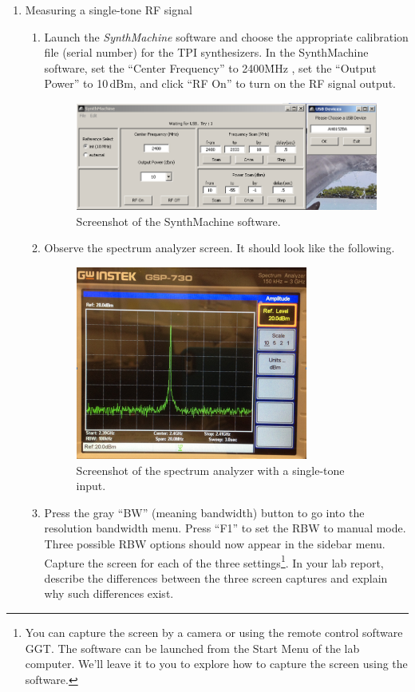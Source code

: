 \documentclass[letterpaper, 11pt]{article}
\begin{document}
\begin{enumerate}
	\item Measuring a single-tone RF signal
		\begin{enumerate}
			\item Launch the \textit{SynthMachine} software and choose the appropriate calibration file (serial number) for the TPI synthesizers. In the SynthMachine software, set the ``Center Frequency'' to 2400\.MHz , set the ``Output Power'' to 10\,dBm, and click ``RF On'' to turn on the RF signal output. 
				\begin{figure}[h]
					\centering
					\includegraphics[width=5in]{synth-machine}
					\caption{Screenshot of the SynthMachine software.}
					\label{fig:synth-machine}
				\end{figure}
							
			\item Observe the spectrum analyzer screen. It should look like the following. 
				\begin{figure}[h]
					\centering
					\includegraphics[width=3in]{sa-single-tone}
					\caption{Screenshot of the spectrum analyzer with a single-tone input.}
					\label{fig:sa-single-tone}
				\end{figure}		
									
			\item Press the gray ``BW'' (meaning bandwidth) button to go into the resolution bandwidth menu. Press ``F1'' to set the RBW to manual mode. Three possible RBW options should now appear in the sidebar menu. Capture the screen for each of the three settings\footnote{You can capture the screen by a camera or using the remote control software GGT. The software can be launched from the Start Menu of the lab computer. We’ll leave it to you to explore how to capture the screen using the software.}. In your lab report, describe the differences between the three screen captures and explain why such differences exist.
							

\end{enumerate}
\end{enumerate}
\end{document}
